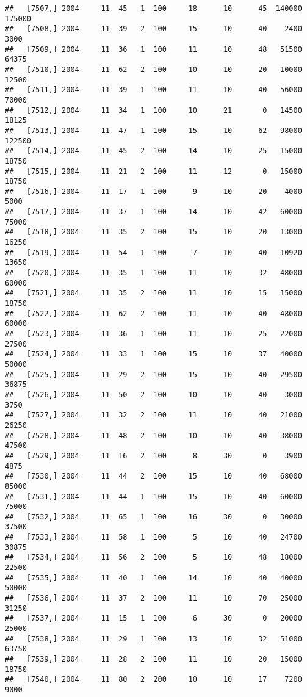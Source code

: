 \documentclass{article}\usepackage[]{graphicx}\usepackage[]{color}
\makeatletter
\newenvironment{kframe}{%
 \def\at@end@of@kframe{}%
 \ifinner\ifhmode%
  \def\at@end@of@kframe{\end{minipage}}%
  \begin{minipage}{\columnwidth}%
 \fi\fi%
 \def\FrameCommand##1{\hskip\@totalleftmargin \hskip-\fboxsep
 \colorbox{shadecolor}{##1}\hskip-\fboxsep
     \hskip-\linewidth \hskip-\@totalleftmargin \hskip\columnwidth}%
 \MakeFramed {\advance\hsize-\width
   \@totalleftmargin\z@ \linewidth\hsize
   \@setminipage}}%
 {\par\unskip\endMakeFramed%
 \at@end@of@kframe}
\newenvironment{knitrout}{}{} %
\makeatother
\begin{document}
\begin{knitrout}
\begin{kframe}
\begin{verbatim}
##   [7507,] 2004     11  45   1  100     18      10      45  140000  175000
##   [7508,] 2004     11  39   2  100     15      10      40    2400    3000
##   [7509,] 2004     11  36   1  100     11      10      48   51500   64375
##   [7510,] 2004     11  62   2  100     10      10      20   10000   12500
##   [7511,] 2004     11  39   1  100     11      10      40   56000   70000
##   [7512,] 2004     11  34   1  100     10      21       0   14500   18125
##   [7513,] 2004     11  47   1  100     15      10      62   98000  122500
##   [7514,] 2004     11  45   2  100     14      10      25   15000   18750
##   [7515,] 2004     11  21   2  100     11      12       0   15000   18750
##   [7516,] 2004     11  17   1  100      9      10      20    4000    5000
##   [7517,] 2004     11  37   1  100     14      10      42   60000   75000
##   [7518,] 2004     11  35   2  100     15      10      20   13000   16250
##   [7519,] 2004     11  54   1  100      7      10      40   10920   13650
##   [7520,] 2004     11  35   1  100     11      10      32   48000   60000
##   [7521,] 2004     11  35   2  100     11      10      15   15000   18750
##   [7522,] 2004     11  62   2  100     11      10      40   48000   60000
##   [7523,] 2004     11  36   1  100     11      10      25   22000   27500
##   [7524,] 2004     11  33   1  100     15      10      37   40000   50000
##   [7525,] 2004     11  29   2  100     15      10      40   29500   36875
##   [7526,] 2004     11  50   2  100     10      10      40    3000    3750
##   [7527,] 2004     11  32   2  100     11      10      40   21000   26250
##   [7528,] 2004     11  48   2  100     10      10      40   38000   47500
##   [7529,] 2004     11  16   2  100      8      30       0    3900    4875
##   [7530,] 2004     11  44   2  100     15      10      40   68000   85000
##   [7531,] 2004     11  44   1  100     15      10      40   60000   75000
##   [7532,] 2004     11  65   1  100     16      30       0   30000   37500
##   [7533,] 2004     11  58   1  100      5      10      40   24700   30875
##   [7534,] 2004     11  56   2  100      5      10      48   18000   22500
##   [7535,] 2004     11  40   1  100     14      10      40   40000   50000
##   [7536,] 2004     11  37   2  100     11      10      70   25000   31250
##   [7537,] 2004     11  15   1  100      6      30       0   20000   25000
##   [7538,] 2004     11  29   1  100     13      10      32   51000   63750
##   [7539,] 2004     11  28   2  100     11      10      20   15000   18750
##   [7540,] 2004     11  80   2  200     10      10      17    7200    9000

\end{verbatim}
\end{kframe}
\end{knitrout}
\end{document}

